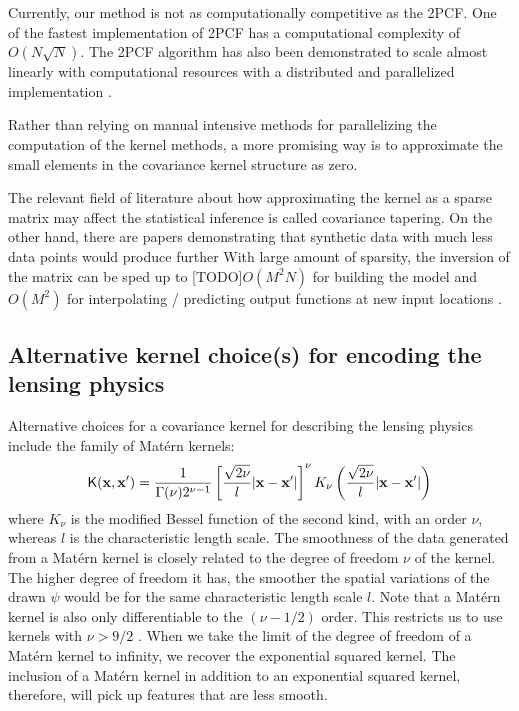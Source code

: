 Currently, our method is not as computationally competitive as the 2PCF. One of
the fastest implementation of 2PCF has a computational complexity of $O(N\sqrt{N})$.
The 2PCF algorithm has also been demonstrated to scale almost linearly with
computational resources 
with a distributed and parallelized implementation \citep{Chhugani2012}.

Rather than relying on manual intensive methods for parallelizing the
computation of the kernel methods, a more promising way is to approximate the
small elements in the covariance kernel structure as zero. 

The relevant field of literature about how approximating the kernel as a sparse
matrix may affect the
statistical inference is called covariance tapering. 
On the other hand, \citep{Snelson2006}
there are papers demonstrating that synthetic data with much less data points  
would produce further 
With large amount of
sparsity, the inversion of the matrix can be sped up to [TODO]$O(M^2N)$ for
building the model and $O(M^2)$ for interpolating / predicting output functions
at new input locations \citep{Snelson2006}.
  



\subsection{Alternative kernel choice(s) for encoding the lensing physics}
Alternative choices for a covariance kernel for describing the lensing physics 
include the family of Mat\'{e}rn kernels:
\begin{equation}
	\mathsf{K}(\mathbf{x}, \mathbf{x}') = \frac{1}{\Gamma(\nu)2^{\nu-1}}\left[
		\frac{\sqrt{2\nu}}{l}|\mathbf{x} - \mathbf{x}'|
	\right]^\nu K_\nu \left(\frac{\sqrt{2\nu}}{l}|\mathbf{x}-\mathbf{x}'|\right) 
\end{equation}
where $K_\nu$ is the modified Bessel function of the second kind, with an order
$\nu$, whereas $l$ is the characteristic length scale.
The smoothness of the data generated from a Mat\'{e}rn kernel is closely
related to the degree of freedom $\nu$ of the kernel. 
The higher degree of freedom it has, the smoother the spatial variations of the
drawn $\psi$ would be for the same characteristic length scale $l$.
Note that a Mat\'{e}rn kernel is also only differentiable to the $(\nu-1/2)$ order.
This restricts us to use kernels with $\nu > 9/2$ . 
When we take the limit of the degree of freedom of a Mat\'{e}rn kernel to infinity, 
we recover the exponential squared kernel. The inclusion of a Mat\'{e}rn kernel
in addition to an exponential squared kernel, therefore, will pick up features
that are less smooth.

